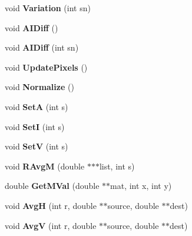 \begin{DoxyCompactItemize}
\item 
\hypertarget{class_turing_a605968ae274cfe384997af773c560cfc}{void {\bfseries Variation} (int sn)}\label{class_turing_a605968ae274cfe384997af773c560cfc}

\item 
\hypertarget{class_turing_ab35cd4dd6416da85efbc35f4e297d8aa}{void {\bfseries A\+I\+Diff} ()}\label{class_turing_ab35cd4dd6416da85efbc35f4e297d8aa}

\item 
\hypertarget{class_turing_ac72f82d66c0f62615b66684f891e93e9}{void {\bfseries A\+I\+Diff} (int sn)}\label{class_turing_ac72f82d66c0f62615b66684f891e93e9}

\item 
\hypertarget{class_turing_ad947e4f6b08ae9f3b933a91276df344d}{void {\bfseries Update\+Pixels} ()}\label{class_turing_ad947e4f6b08ae9f3b933a91276df344d}

\item 
\hypertarget{class_turing_a86078276c0ebf7144d60c07708d3e421}{void {\bfseries Normalize} ()}\label{class_turing_a86078276c0ebf7144d60c07708d3e421}

\item 
\hypertarget{class_turing_a919317f43dfc9f3727554fac99753db5}{void {\bfseries Set\+A} (int s)}\label{class_turing_a919317f43dfc9f3727554fac99753db5}

\item 
\hypertarget{class_turing_a0e07e6ece3c9438c56bcdcfa21cc155d}{void {\bfseries Set\+I} (int s)}\label{class_turing_a0e07e6ece3c9438c56bcdcfa21cc155d}

\item 
\hypertarget{class_turing_ab7e478862023f611d69351140064ded3}{void {\bfseries Set\+V} (int s)}\label{class_turing_ab7e478862023f611d69351140064ded3}

\item 
\hypertarget{class_turing_aed92fd348c348f10c5d3e7ffce20a054}{void {\bfseries R\+Avg\+M} (double $\ast$$\ast$$\ast$list, int s)}\label{class_turing_aed92fd348c348f10c5d3e7ffce20a054}

\item 
\hypertarget{class_turing_ae4f213fe8dd03a88d3e0646129ceb655}{double {\bfseries Get\+M\+Val} (double $\ast$$\ast$mat, int x, int y)}\label{class_turing_ae4f213fe8dd03a88d3e0646129ceb655}

\item 
\hypertarget{class_turing_a75196d7c35a9773b579e50ec886fffd7}{void {\bfseries Avg\+H} (int r, double $\ast$$\ast$source, double $\ast$$\ast$dest)}\label{class_turing_a75196d7c35a9773b579e50ec886fffd7}

\item 
\hypertarget{class_turing_ad37aeeae70eb8dc32fed1fab814253a9}{void {\bfseries Avg\+V} (int r, double $\ast$$\ast$source, double $\ast$$\ast$dest)}\label{class_turing_ad37aeeae70eb8dc32fed1fab814253a9}

\end{DoxyCompactItemize}
